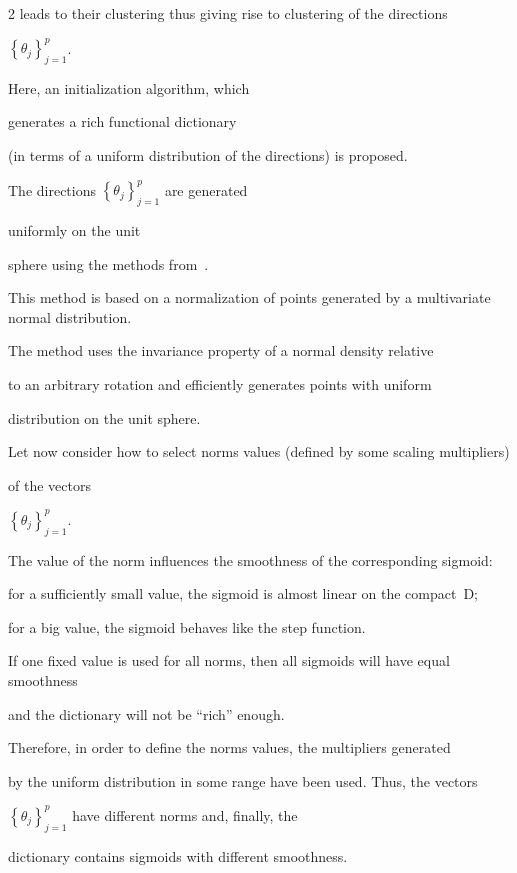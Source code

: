 \begin{multicols}{2}
   leads to their clustering thus giving rise to clustering of the directions 

   $\left\{\theta_j\right\}_{j = 1}^p$.

Here, an initialization algorithm, which

generates a rich functional dictionary    

(in terms of a uniform distribution of the directions) is proposed.

The directions $\left\{\theta_j\right\}_{j = 1}^p $ are generated

uniformly on the unit 

sphere using the methods from~\cite{SpherRnd}. 

This method is based on a normalization of points generated by a multivariate normal distribution.

The method uses the invariance property of a normal density relative 

to an arbitrary rotation and efficiently generates points with uniform 

distribution on the unit sphere.

   {

   

   }



Let now consider how to select norms values (defined by some scaling multipliers) 

of the vectors

$\left\{\theta_j\right\}_{j=1}^p$.

The value of the norm influences the smoothness of the corresponding sigmoid:

for a sufficiently small value, the sigmoid is almost linear on the compact~D;  

for a big value, the sigmoid behaves like the step function.

If one fixed value is used for all norms, then all sigmoids will have equal smoothness 

and the dictionary will not be ``rich'' enough.

Therefore, in order to define the norms values, the multipliers generated 

by the uniform distribution in some range have been used. Thus, the vectors 

$\left\{\theta_j\right\}_{j=1}^p$ have different norms and, finally, the 

dictionary contains sigmoids with different smoothness.


\end{multicols}
